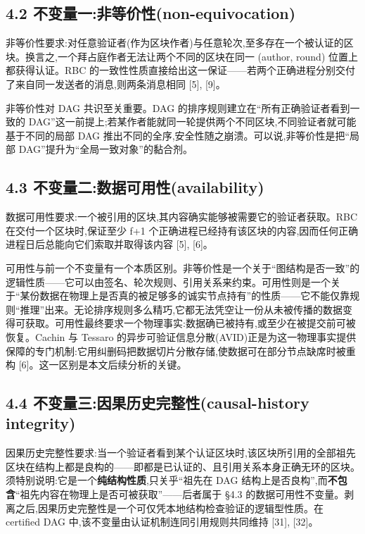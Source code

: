 \documentclass[UTF8,fontset=windows,a4paper,11pt]{ctexart}
\begin{document}
\subsection{4.2
不变量一:非等价性(non-equivocation)}\label{ux4e0dux53d8ux91cfux4e00ux975eux7b49ux4ef7ux6027non-equivocation}

非等价性要求:对任意验证者(作为区块作者)与任意轮次,至多存在一个被认证的区块。换言之,一个拜占庭作者无法让两个不同的区块在同一
(author, round) 位置上都获得认证。RBC
的一致性性质直接给出这一保证------若两个正确进程分别交付了来自同一发送者的消息,则两条消息相同
{[}5{]}, {[}9{]}。

非等价性对 DAG 共识至关重要。DAG
的排序规则建立在``所有正确验证者看到一致的
DAG''这一前提上;若某作者能就同一轮提供两个不同区块,不同验证者就可能基于不同的局部
DAG 推出不同的全序,安全性随之崩溃。可以说,非等价性是把``局部
DAG''提升为``全局一致对象''的黏合剂。

\subsection{4.3
不变量二:数据可用性(availability)}\label{ux4e0dux53d8ux91cfux4e8cux6570ux636eux53efux7528ux6027availability}

数据可用性要求:一个被引用的区块,其内容确实能够被需要它的验证者获取。RBC
在交付一个区块时,保证至少 f+1
个正确进程已经持有该区块的内容,因而任何正确进程日后总能向它们索取并取得该内容
{[}5{]}, {[}6{]}。

可用性与前一个不变量有一个本质区别。非等价性是一个关于``图结构是否一致''的逻辑性质------它可以由签名、轮次规则、引用关系来约束。可用性则是一个关于``某份数据在物理上是否真的被足够多的诚实节点持有''的性质------它不能仅靠规则``推理''出来。无论排序规则多么精巧,它都无法凭空让一份从未被传播的数据变得可获取。可用性最终要求一个物理事实:数据确已被持有,或至少在被提交前可被恢复。Cachin
与 Tessaro
的异步可验证信息分散(AVID)正是为这一物理事实提供保障的专门机制:它用纠删码把数据切片分散存储,使数据可在部分节点缺席时被重构
{[}6{]}。这一区别是本文后续分析的关键。

\subsection{4.4 不变量三:因果历史完整性(causal-history
integrity)}\label{ux4e0dux53d8ux91cfux4e09ux56e0ux679cux5386ux53f2ux5b8cux6574ux6027causal-history-integrity}

因果历史完整性要求:当一个验证者看到某个认证区块时,该区块所引用的全部祖先区块在结构上都是良构的------即都是已认证的、且引用关系本身正确无环的区块。须特别说明:它是一个\textbf{纯结构性质},只关乎``祖先在 DAG 结构上是否良构'',而\textbf{不包含}``祖先内容在物理上是否可被获取''------后者属于 §4.3 的数据可用性不变量。剥离之后,因果历史完整性是一个可仅凭本地结构检查验证的逻辑型性质。在 certified DAG 中,该不变量由认证机制连同引用规则共同维持 {[}31{]}, {[}32{]}。
\end{document}
